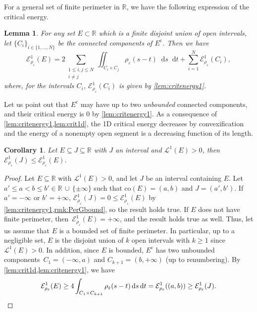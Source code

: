\documentclass[JEP,XML,SOM,Unicode,published]{cedram}
\numberwithin{equation}{section}
\theoremstyle{plain}
\newtheorem{lem}[thm]{Lemma}
\newtheorem{cor}[thm]{Corollary}
\theoremstyle{definition}
\newcommand{\numberset}[1]{{\mathbb{#1}}}
\newcommand{\R}{\numberset{R}}
\newcommand{\dt}{\mathop{}\mathopen{}\mathrm{d}t}
\newcommand{\ds}{\mathop{}\mathopen{}\mathrm{d}s}
\newcommand{\calE}{{\mathcal{E}}}
\newcommand{\calL}{{\mathscr{L}}}
\let\eps\varepsilon
\newcommand{\co}{{\mathrm{co}}}
\newcommand{\compl}{{\mathrm{c}}}
\newcommand{\subsq}{\subseteq}
\begin{document}
For a general set of finite perimeter in $\R$, we have the following expression of the critical
energy.

\begin{lem}\label{lem:crit1d}
For any set $E\subset\R$ which is a finite disjoint union of open intervals, let
$\{C_i\}_{i\in\{1,\dotsc,N\}}$ be the connected components of $E^\compl$. Then we have
\begin{equation}\label{crit1d:res}
\calE^1_{\rho_\eps}(E)=2\sum_{\substack{1\leq i,j\leq N\\i\neq j}} \iint_{C_i\times C_j}
\rho_\eps(s-t)\ds\dt + \sum_{i=1}^N \calE_{\rho_\eps}^1(C_i),
\end{equation}
where, for the intervals $C_i$, $\calE_{\rho_\eps}^1(C_i)$ is given by \cref{lem:critenergy1}.
\end{lem}

Let us point out that $E^\compl$ may have up to two \emph{unbounded} connected
components, and their critical energy is $0$ by \cref{lem:critenergy1}. As a consequence of
\cref{lem:critenergy1,lem:crit1d}, the 1D critical energy decreases by convexification and the
energy of a nonempty open segment is a decreasing function of its length.

\begin{cor}\label{cor:critdecconv}
Let $E\subsq J\subsq\R$ with $J$ an interval and $\calL^1(E)>0$, then
$\calE^1_{\rho_\eps}(J)\leq\calE^1_{\rho_\eps}(E)$.
\end{cor}

\begin{proof}
Let $E\subsq\R$ with $\calL^1(E)>0$, and let $J$ be an interval containing $E$.
Let $a'\leq a<b\leq b'\in \R\,\cup\,\{\pm\infty\}$ such that $\co(E)=(a,b)$ and $J=(a',b')$.
If $a'=-\infty$ or $b'=+\infty$, $\calE_{\rho_\eps}^1(J)=0\leq \calE^1_{\rho_\eps}(E)$ by
\cref{lem:critenergy1,rmk:PerGbound}, so the result holds true.
If $E$ does not have finite perimeter, then~${\calE^1_{\rho_\eps}(E)=+\infty}$, and the result holds
true as well. Thus, let us assume that $E$ is a bounded set of finite perimeter.
In particular, up to a negligible set, $E$ is the disjoint union of $k$ open intervals with $k\geq
1$ since $\calL^1(E)>0$. In addition, since $E$ is bounded, $E^\compl$ has two
unbounded components~${C_1=(-\infty,a)}$ and $C_{k+1}=(b,+\infty)$ (up to renumbering).
By \cref{lem:crit1d,lem:critenergy1}, we have
\[
\calE^1_{\rho_\eps}(E)\geq 4\int_{C_1\times C_{k+1}} \rho_\eps(s-t)\ds\dt
=\calE^1_{\rho_\eps}((a,b))
\geq \calE^1_{\rho_\eps}(J).\qedhere
\]
\end{proof}
\end{document}
